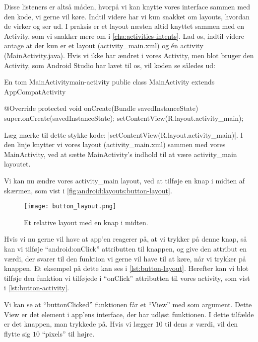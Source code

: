 Disse listeners er altså måden, hvorpå vi kan knytte vores \gls{interface} 
sammen med den kode, vi gerne vil køre. Indtil videre har vi kun snakket om 
layouts, hvordan de virker og ser ud. I praksis er et layout næsten altid 
knyttet sammen med en Activity, som vi snakker mere om i 
\autoref{cha:activities-intents}. Lad os, indtil videre antage at der kun er et 
layout (activity\_main.xml) og én activity (MainActivity.java). Hvis vi ikke 
har ændret i vores Activity, men blot bruger den Activity, som Android Studio 
har lavet til os, vil koden se således ud:

\begin{JavaCode}{En tom MainActivity}{main-activity}
	public class MainActivity extends AppCompatActivity {
		
		@Override
		protected void onCreate(Bundle savedInstanceState) {
			super.onCreate(savedInstanceState);
			setContentView(R.layout.activity_main);
		}
	
	}
\end{JavaCode}

Læg mærke til dette stykke kode: 
\JavaInline|setContentView(R.layout.activity_main)|. I den linje knytter vi 
vores layout (activity\_main.xml) sammen med vores MainActivity, ved at sætte 
MainActivity's indhold til at være activity\_main layoutet.

Vi kan nu ændre vores activity\_main layout, ved at tilføje en knap i midten af 
skærmen, som vist i \autoref{fig:android:layouts:button-layout}.

\begin{figure}[h]
	\begin{center}
		\texttt{[image: button\_layout.png]}
		\caption{Et relative layout med en knap i midten.}
		\label{fig:android:layouts:button-layout}
	\end{center}
\end{figure}

Hvis vi nu gerne vil have at app'en reagerer på, at vi trykker på denne knap, så 
kan vi tilføje ``android:onClick'' attributten til knappen, og give den attribut 
en værdi, der svarer til den funktion vi gerne vil have til at køre, når vi 
trykker på knappen. Et eksempel på dette kan ses i \autoref{lst:button-layout}.
Herefter kan vi blot tilføje den funktion vi tilføjede i ``onClick'' 
attributten til vores activity, som vist i \autoref{lst:button-activity}.

Vi kan se at ``buttonClicked'' funktionen får et ``View'' med som argument. 
Dette View er det element i app'ens \gls{interface}, der har udløst funktionen. 
I dette tilfælde er det knappen, man trykkede på. Hvis vi lægger $10$ til dens 
$x$ værdi, vil den flytte sig $10$ ``pixels'' til højre.

